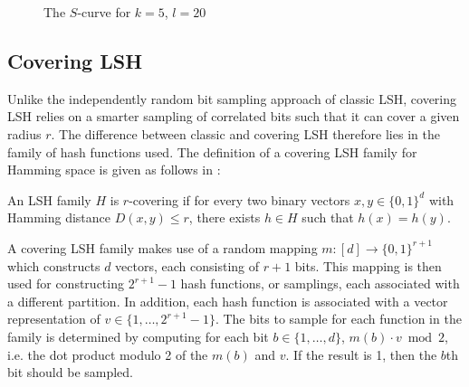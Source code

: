 \begin{figure}[ht]

  \caption{The $S$-curve for $k = 5$, $l = 20$}
\end{figure}

\subsection{Covering LSH}
\label{background-covering-lsh}

Unlike the independently random bit sampling approach of classic LSH, covering LSH relies on a smarter sampling of correlated bits such that it can cover a given radius $r$. The difference between classic and covering LSH therefore lies in the family of hash functions used. The definition of a covering LSH family for Hamming space is given as follows in \cite{DBLP:journals/corr/PhamP16}:

\begin{definition}
\label{definition-covering-family}
  An LSH family $H$ is $r$-covering if for every two binary vectors $x, y \in \{0, 1\}^d$ with Hamming distance $D(x, y) \leq r$, there exists $h \in H$ such that $h(x) = h(y)$.
\end{definition}

A covering LSH family makes use of a random mapping $m \colon [d] \rightarrow \{0, 1\}^{r + 1}$ which constructs $d$ vectors, each consisting of $r + 1$ bits. This mapping is then used for constructing $2^{r + 1} - 1$ hash functions, or samplings, each associated with a different partition. In addition, each hash function is associated with a vector representation of $v \in \{1, \ldots, 2^{r + 1} - 1\}$. The bits to sample for each function in the family is determined by computing for each bit $b \in \{1, \ldots, d\}$, $m(b) \cdot v \bmod 2$, i.e. the dot product modulo 2 of the $m(b)$ and $v$. If the result is 1, then the $b$th bit should be sampled.

